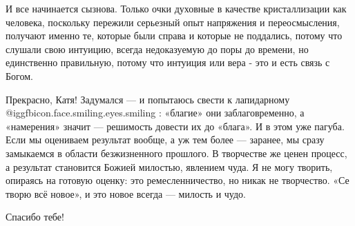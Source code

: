 И все начинается сызнова. Только очки духовные в качестве кристаллизации как
человека, поскольку пережили серьезный опыт напряжения и переосмысления,
получают именно те, которые были справа и которые не поддались, потому что
слушали свою интуицию, всегда недоказуемую до поры до времени, но единственно
правильную, потому что интуиция или вера - это и есть связь с Богом.

\begin{itemize} %

Прекрасно, Катя! Задумался — и попытаюсь свести к лапидарному  @igg{fbicon.face.smiling.eyes.smiling} : «благие» они
заблаговременно, а «намерения» значит — решимость довести их до «блага». И в
этом уже пагуба. Если мы оцениваем результат вообще, а уж тем более — заранее,
мы сразу замыкаемся в области безжизненного прошлого. В творчестве же ценен
процесс, а результат становится Божией милостью, явлением чуда. Я не могу
творить, опираясь на готовую оценку: это ремесленничество, но никак не
творчество. «Се творю всё новое», и это новое всегда — милость и чудо.

Спасибо тебе!

\end{itemize} %
